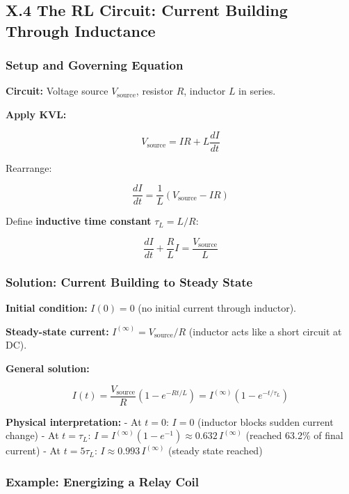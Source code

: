 \documentclass[
]{article}
\begin{document}
\subsection{X.4 The RL Circuit: Current Building Through
Inductance}\label{x.4-the-rl-circuit-current-building-through-inductance}

\subsubsection{Setup and Governing
Equation}\label{setup-and-governing-equation-1}

\textbf{Circuit:} Voltage source \(V_{\text{source}}\), resistor \(R\),
inductor \(L\) in series.

\textbf{Apply KVL:}

\[V_{\text{source}} = IR + L\frac{dI}{dt}\]

Rearrange:

\[\boxed{\frac{dI}{dt} = \frac{1}{L}(V_{\text{source}} - IR)}\]

Define \textbf{inductive time constant} \(\tau_L = L/R\):

\[\frac{dI}{dt} + \frac{R}{L}I = \frac{V_{\text{source}}}{L}\]

\subsubsection{Solution: Current Building to Steady
State}\label{solution-current-building-to-steady-state}

\textbf{Initial condition:} \(I(0) = 0\) (no initial current through
inductor).

\textbf{Steady-state current:} \(I^{(\infty)} = V_{\text{source}}/R\)
(inductor acts like a short circuit at DC).

\textbf{General solution:}

\[\boxed{I(t) = \frac{V_{\text{source}}}{R}(1 - e^{-Rt/L}) = I^{(\infty)}(1 - e^{-t/\tau_L})}\]

\textbf{Physical interpretation:} - At \(t = 0\): \(I = 0\) (inductor
blocks sudden current change) - At \(t = \tau_L\):
\(I = I^{(\infty)}(1 - e^{-1}) \approx 0.632 \, I^{(\infty)}\) (reached
63.2\% of final current) - At \(t = 5\tau_L\):
\(I \approx 0.993 \, I^{(\infty)}\) (steady state reached)

\subsubsection{Example: Energizing a Relay
Coil}\label{example-energizing-a-relay-coil}
\end{document}
